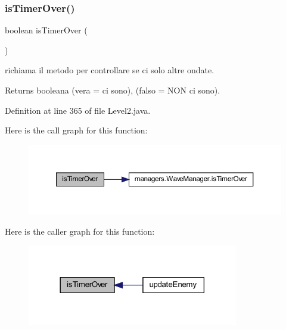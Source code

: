 \subsubsection{\texorpdfstring{is\+Timer\+Over()}{isTimerOver()}}
{\footnotesize\ttfamily boolean is\+Timer\+Over (\begin{DoxyParamCaption}{ }\end{DoxyParamCaption})\hspace{0.3cm}{\ttfamily [private]}}



richiama il metodo per controllare se ci solo altre ondate. 

\begin{DoxyReturn}{Returns}
booleana (vera = ci sono), (falso = N\+ON ci sono). 
\end{DoxyReturn}


Definition at line 365 of file Level2.\+java.

Here is the call graph for this function\+:\nopagebreak
\begin{figure}[H]
\begin{center}
\leavevmode
\includegraphics[width=350pt]{classscenes_1_1_level2_ab68417e6738c05037923f5f0f21eb586_cgraph}
\end{center}
\end{figure}
Here is the caller graph for this function\+:\nopagebreak
\begin{figure}[H]
\begin{center}
\leavevmode
\includegraphics[width=261pt]{classscenes_1_1_level2_ab68417e6738c05037923f5f0f21eb586_icgraph}
\end{center}
\end{figure}
\mbox{\label{classscenes_1_1_level2_aa12eb1084be2c4d9b03d5f248f00900d}} 
